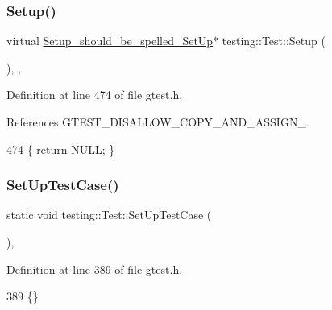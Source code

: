 \subsubsection{\texorpdfstring{Setup()}{Setup()}}
{\footnotesize\ttfamily virtual \hyperlink{structtesting_1_1Test_1_1Setup__should__be__spelled__SetUp}{Setup\+\_\+should\+\_\+be\+\_\+spelled\+\_\+\+Set\+Up}$\ast$ testing\+::\+Test\+::\+Setup (\begin{DoxyParamCaption}{ }\end{DoxyParamCaption})\hspace{0.3cm}{\ttfamily [inline]}, {\ttfamily [private]}, {\ttfamily [virtual]}}



Definition at line 474 of file gtest.\+h.



References G\+T\+E\+S\+T\+\_\+\+D\+I\+S\+A\+L\+L\+O\+W\+\_\+\+C\+O\+P\+Y\+\_\+\+A\+N\+D\+\_\+\+A\+S\+S\+I\+G\+N\+\_\+.


\begin{DoxyCode}
474 \{ \textcolor{keywordflow}{return} NULL; \}
\end{DoxyCode}
\mbox{\label{classtesting_1_1Test_a5ccbac42fee8c5b00b0bfe89b6c49d79}} 
\subsubsection{\texorpdfstring{Set\+Up\+Test\+Case()}{SetUpTestCase()}}
{\footnotesize\ttfamily static void testing\+::\+Test\+::\+Set\+Up\+Test\+Case (\begin{DoxyParamCaption}{ }\end{DoxyParamCaption})\hspace{0.3cm}{\ttfamily [inline]}, {\ttfamily [static]}}



Definition at line 389 of file gtest.\+h.


\begin{DoxyCode}
389 \{\}
\end{DoxyCode}
\mbox{\label{classtesting_1_1Test_a2889fd829b6c712d98fb3896d28f64a3}} 

